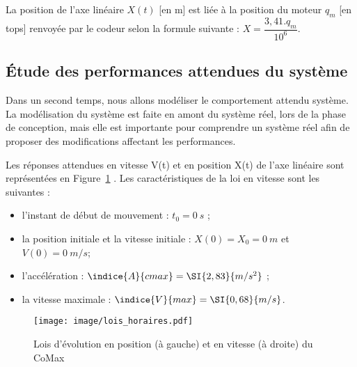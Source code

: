 \vspace{5mm}
La position de l'axe linéaire $X(t)$ [en m] est liée à la position du moteur $q_m$ [en tops] renvoyée par le codeur selon la formule suivante : $X = \dfrac{3,41.q_m}{10^6}$. 

\vspace{5mm}

\vspace{5mm}

\subsection{Étude des performances attendues du système}
Dans un second temps, nous allons modéliser le comportement attendu système. La modélisation du système est faite en amont du système réel, lors de la phase de conception, mais elle est importante pour comprendre un système réel afin de proposer des modifications affectant les performances.

Les réponses attendues en vitesse V(t) et en position X(t) de l’axe linéaire sont représentées en Figure~\ref{lois_horaires} . Les caractéristiques de la loi en vitesse sont les suivantes :
\begin{itemize}
\item l’instant de début de mouvement : $t_0=\SI{0}{s}$ ;
\item la position initiale et la vitesse initiale : $X(0)=X_0=\SI{0}{m}$ et $V(0)=\SI{0}{m/s}$;
\item l’accélération : $\indice{A}{cmax}=\SI{2,83}{m/s^2}$ ;
\item la vitesse maximale : $\indice{V}{max}=\SI{0,68}{m/s}$.
\end{itemize}

\begin{figure}[!h]
\centering
\texttt{[image: image/lois\_horaires.pdf]}
\caption{Lois d'évolution en position (à gauche) et en vitesse (à droite) du CoMax}
\label{lois_horaires}
\end{figure}

